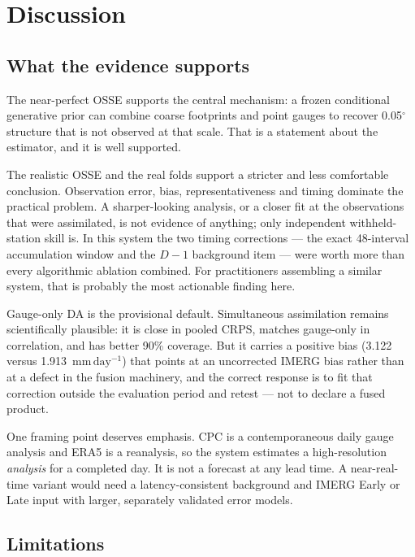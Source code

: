 \documentclass[10pt,twocolumn]{article}
\newcommand{\mmday}{\mathrm{mm\,day^{-1}}}
\begin{document}
\section{Discussion}

\subsection{What the evidence supports}

The near-perfect OSSE supports the central mechanism: a frozen conditional
generative prior can combine coarse footprints and point gauges to recover
0.05$^\circ$ structure that is not observed at that scale. That is a statement
about the estimator, and it is well supported.

The realistic OSSE and the real folds support a stricter and less comfortable
conclusion. Observation error, bias, representativeness and timing dominate
the practical problem. A sharper-looking analysis, or a closer fit at the
observations that were assimilated, is not evidence of anything; only
independent withheld-station skill is. In this system the two timing
corrections --- the exact 48-interval accumulation window and the $D-1$
background item --- were worth more than every algorithmic ablation combined.
For practitioners assembling a similar system, that is probably the most
actionable finding here.

Gauge-only DA is the provisional default. Simultaneous assimilation remains
scientifically plausible: it is close in pooled CRPS, matches gauge-only in
correlation, and has better 90\% coverage. But it carries a positive bias
(3.122 versus 1.913~$\mmday$) that points at an uncorrected IMERG bias rather
than at a defect in the fusion machinery, and the correct response is to fit
that correction outside the evaluation period and retest --- not to declare a
fused product.

One framing point deserves emphasis. CPC is a contemporaneous daily gauge
analysis and ERA5 is a reanalysis, so the system estimates a high-resolution
\emph{analysis} for a completed day. It is not a forecast at any lead time. A
near-real-time variant would need a latency-consistent background and IMERG
Early or Late input with larger, separately validated error models.

\subsection{Limitations}
\label{sec:limits}
\end{document}
